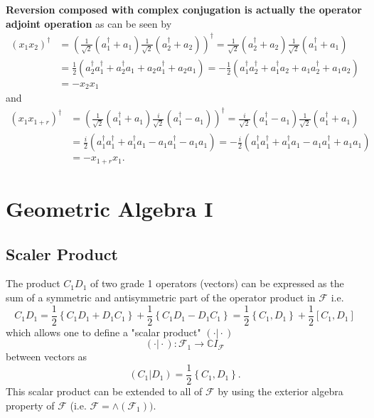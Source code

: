 \documentclass[aps, preprint]{revtex4}
\begin{document}
\textbf{Reversion composed with complex conjugation is actually the operator adjoint operation} as can be
seen by
\begin{align}\left (x_{1} x_{2}\right )^{ \dag } &  =\left (\frac{1}{\sqrt{2}} \left (a_{1}^{ \dag } +a_{1}\right ) \frac{1}{\sqrt{2}} \left (a_{2}^{ \dag } +a_{2}\right )\right )^{ \dag } =\frac{1}{\sqrt{2}} \left (a_{2}^{ \dag } +a_{2}\right ) \frac{1}{\sqrt{2}} \left (a_{1}^{ \dag } +a_{1}\right ) \nonumber  \\
 &  =\frac{1}{2} \left (a_{2}^{ \dag } a_{1}^{ \dag } +a_{2}^{ \dag } a_{1} +a_{2} a_{1}^{ \dag } +a_{2} a_{1}\right ) = -\frac{1}{2} \left (a_{1}^{ \dag } a_{2}^{ \dag } +a_{1}^{ \dag } a_{2} +a_{1} a_{2}^{ \dag } +a_{1} a_{2}\right ) \nonumber  \\
 &  = -x_{2} x_{1}\end{align}and
\begin{align}\left (x_{1} x_{1 +r}\right )^{ \dag } &  =\left (\frac{1}{\sqrt{2}} \left (a_{1}^{ \dag } +a_{1}\right ) \frac{i}{\sqrt{2}} \left (a_{1}^{ \dag } -a_{1}\right )\right )^{ \dag } =\frac{i}{\sqrt{2}} \left (a_{1}^{ \dag } -a_{1}\right ) \frac{1}{\sqrt{2}} \left (a_{1}^{ \dag } +a_{1}\right ) \nonumber  \\
 &  =\frac{i}{2} \left (a_{1}^{ \dag } a_{1}^{ \dag } +a_{1}^{ \dag } a_{1} -a_{1} a_{1}^{ \dag } -a_{1} a_{1}\right ) = -\frac{i}{2} \left (a_{1}^{ \dag } a_{1}^{ \dag } +a_{1}^{ \dag } a_{1} -a_{1} a_{1}^{ \dag } +a_{1} a_{1}\right ) \nonumber  \\
 &  = -x_{1 +r} x_{1}\text{.}\end{align}

\section{Geometric Algebra I}


\subsection{Scaler Product}
The product $C_{1} D_{1}$ of two grade 1 operators (vectors) can be expressed as the sum of a symmetric and antisymmetric part of the operator product in $\mathcal{F}$ i.e.
\begin{equation}C_{1} D_{1} =\frac{1}{2} \left \{C_{1} D_{1} +D_{1} C_{1}\right \} +\frac{1}{2} \left \{C_{1} D_{1} -D_{1} C_{1}\right \} =\frac{1}{2} \left \{C_{1} ,D_{1}\right \} +\frac{1}{2} \left [C_{1} ,D_{1}\right ]
\end{equation}which allows one to define a "scalar product" $( \cdot \vert  \cdot )$
\begin{equation}( \cdot \vert  \cdot ) :\mathcal{F}_{1} \longrightarrow \mathbb{C} I_{\mathcal{F}}
\end{equation}between vectors as
\begin{equation}(C_{1}\vert D_{1}) =\frac{1}{2} \left \{C_{1} ,D_{1}\right \}\text{.}
\end{equation}This scalar product can be extended to all of $\mathcal{F}$ by using the exterior algebra property of $\mathcal{F}$ (i.e. $\mathcal{F} = \wedge \left (\mathcal{F}_{1}\right ))\text{.}$ 
\end{document}
